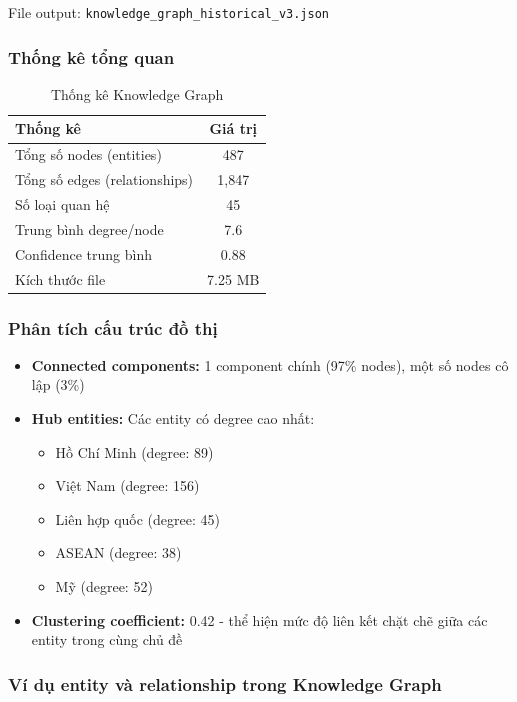 File output: \texttt{knowledge\_graph\_historical\_v3.json}

\subsubsection{Thống kê tổng quan}

\begin{table}[H]
\centering
\caption{Thống kê Knowledge Graph}
\label{tab:kg-stats}
\begin{tabular}{|l|c|}
\hline
\textbf{Thống kê} & \textbf{Giá trị} \\
\hline
Tổng số nodes (entities) & 487 \\
Tổng số edges (relationships) & 1,847 \\
Số loại quan hệ & 45 \\
Trung bình degree/node & 7.6 \\
Confidence trung bình & 0.88 \\
Kích thước file & 7.25 MB \\
\hline
\end{tabular}
\end{table}

\subsubsection{Phân tích cấu trúc đồ thị}

\begin{itemize}
    \item \textbf{Connected components:} 1 component chính (97\% nodes), một số nodes cô lập (3\%)
    
    \item \textbf{Hub entities:} Các entity có degree cao nhất:
    \begin{itemize}
        \item Hồ Chí Minh (degree: 89)
        \item Việt Nam (degree: 156)
        \item Liên hợp quốc (degree: 45)
        \item ASEAN (degree: 38)
        \item Mỹ (degree: 52)
    \end{itemize}
    
    \item \textbf{Clustering coefficient:} 0.42 - thể hiện mức độ liên kết chặt chẽ giữa các entity trong cùng chủ đề
\end{itemize}

\subsubsection{Ví dụ entity và relationship trong Knowledge Graph}

